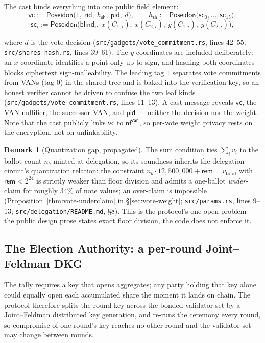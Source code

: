 \documentclass[11pt,a4paper]{article}
\theoremstyle{definition}
\newtheorem{remark}[theorem]{Remark}
\newcommand{\nfsym}{\mathsf{nf}}
\begin{document}
The cast binds everything into one public field element:
\[
\mathsf{vc} := \mathsf{Poseidon}\bigl(1,\ \mathsf{rid},\
h_{\mathsf{sh}},\ \mathsf{pid},\ d\bigr), \qquad
h_{\mathsf{sh}} := \mathsf{Poseidon}\bigl(\mathsf{sc}_0, \ldots,
\mathsf{sc}_{15}\bigr),
\]
\[
\mathsf{sc}_i := \mathsf{Poseidon}\bigl(\mathsf{blind}_i,\ x(C_{1,i}),\
x(C_{2,i}),\ y(C_{1,i}),\ y(C_{2,i})\bigr),
\]
\begin{sloppypar}
where $d$ is the vote decision (\texttt{src/gadgets/vote\_commitment.rs},
lines 42--55; \texttt{src/shares\_hash.rs}, lines 39--61). The
$y$-coordinates are included deliberately: an $x$-coordinate identifies a
point only up to sign, and hashing both coordinates blocks ciphertext
sign-malleability. The leading tag $1$ separates vote commitments from VANs
(tag $0$) in the shared tree and is baked into the verification key, so an
honest verifier cannot be driven to confuse the two leaf kinds
(\texttt{src/gadgets/vote\_commitment.rs}, lines 11--13). A cast message
reveals $\mathsf{vc}$, the VAN nullifier, the successor VAN, and
$\mathsf{pid}$ --- neither the decision nor the weight. Note that the cast
publicly links $\mathsf{vc}$ to $\nfsym^{\mathsf{van}}$, so per-vote weight
privacy rests on the encryption, not on unlinkability.
\end{sloppypar}

\begin{remark}[Quantization gap, propagated]\label{rem:vote-quant}
The sum condition ties $\sum_i v_i$ to the ballot count $n_b$ minted at
delegation, so its soundness inherits the delegation circuit's
quantization relation: the constraint
$n_b \cdot 12{,}500{,}000 + \mathsf{rem} = v_{\mathrm{total}}$ with
$\mathsf{rem} < 2^{24}$ is strictly weaker than floor division and admits a
one-ballot \emph{under}-claim for roughly $34\%$ of note values; an
over-claim is impossible (Proposition~\ref{thm:vote-underclaim} in
\S\ref{sec:vote-weight}; \texttt{src/params.rs}, lines 9--13;
\texttt{src/delegation/README.md}, \S 8). This is the protocol's one open
problem --- the public design prose states exact floor division, the code
does not enforce it.
\end{remark}

\subsection{The Election Authority: a per-round Joint--Feldman DKG}
\label{sec:vote-dkg}

The tally requires a key that opens aggregates; any party holding that key
alone could equally open each accumulated share the moment it lands on
chain. The protocol therefore splits the round key across the bonded
validator set by a Joint--Feldman distributed key generation, and re-runs
the ceremony every round, so compromise of one round's key reaches no other
round and the validator set may change between rounds.
\end{document}
